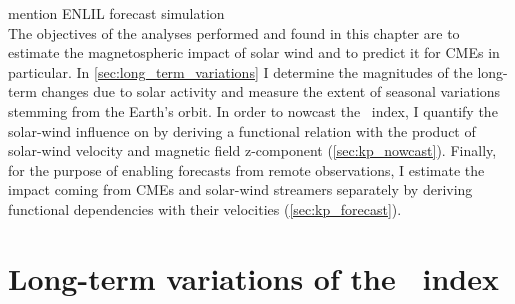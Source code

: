 mention ENLIL forecast simulation\\

The objectives of the analyses performed and found in this chapter are to estimate the magnetospheric impact of solar wind and to predict it for CMEs in particular. In \autoref{sec:long_term_variations} I determine the magnitudes of the long-term \Kp{} changes due to solar activity and measure the extent of seasonal variations stemming from the Earth's orbit. In order to nowcast the \Kp{}~index, I quantify the solar-wind influence on \Kp{} by deriving a functional relation with the product of solar-wind velocity and magnetic field z-component (\autoref{sec:kp_nowcast}). Finally, for the purpose of enabling \Kp{} forecasts from remote observations, I estimate the \Kp{} impact coming from CMEs and solar-wind streamers separately by deriving functional dependencies with their velocities (\autoref{sec:kp_forecast}).


\section{Long-term variations of the \Kp{}~index}
\label{sec:long_term_variations}

